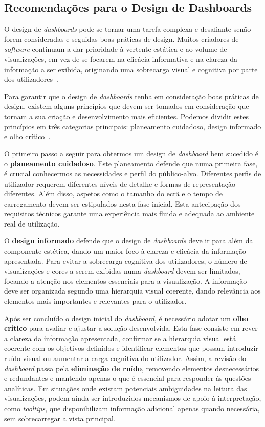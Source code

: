 \subsection{Recomendações para o Design de Dashboards} %
\label{sub:recomendacoes_design}

O design de \textit{dashboards} pode se tornar uma tarefa complexa e desafiante senão forem consideradas e seguidas boas práticas de design. Muitos criadores de \textit{software} continuam a dar prioridade à vertente estática e ao volume de visualizações, em vez de se focarem na eficácia informativa e na clareza da informação a ser exibida, originando uma sobrecarga visual e cognitiva por parte dos utilizadores~\cite{abduldaem2019principles}.

Para garantir que o design de \textit{dashboards} tenha em consideração boas práticas de design, existem alguns princípios que devem ser tomados em consideração que tornam a sua criação e desenvolvimento mais eficientes. Podemos dividir estes princípios em três categorias principais: planeamento cuidadoso, design informado e olho crítico~\cite{Tableau2020}.

O primeiro passo a seguir para obtermos um design de \textit{dashboard} bem sucedido é o \textbf{planeamento cuidadoso}. Este planeamento defende que numa primeira fase, é crucial conhecermos as necessidades e perfil do público-alvo. Diferentes perfis de utilizador requerem diferentes níveis de detalhe e formas de representação diferentes. Além disso, aspetos como o tamanho do ecrã e o tempo de carregamento devem ser estipulados nesta fase inicial. Esta antecipação dos requisitos técnicos garante uma experiência mais fluida e adequada ao ambiente real de utilização.

O \textbf{design informado} defende que o design de \textit{dashboards} deve ir para além da componente estética, dando um maior foco à clareza e eficácia da informação apresentada. Para evitar a sobrecarga cognitiva dos utilizadores, o número de visualizações e cores a serem exibidas numa \textit{dashboard} devem ser limitados, focando a atenção nos elementos essenciais para a visualização. A informação deve ser organizada segundo uma hierarquia visual coerente, dando relevância aos elementos mais importantes e relevantes para o utilizador.  

Após ser concluído o design inicial do \textit{dashboard}, é necessário adotar um \textbf{olho crítico} para avaliar e ajustar a solução desenvolvida. Esta fase consiste em rever a clareza da informação apresentada, confirmar se a hierarquia visual está coerente com os objetivos definidos e identificar elementos que possam introduzir ruído visual ou aumentar a carga cognitiva do utilizador. Assim, a revisão do \textit{dashboard} passa pela \textbf{eliminação de ruído}, removendo elementos desnecessários e redundantes e mantendo apenas o que é essencial para responder às questões analíticas. Em situações onde existam potenciais ambiguidades na leitura das visualizações, podem ainda ser introduzidos mecanismos de apoio à interpretação, como \textit{tooltips}, que disponibilizam informação adicional apenas quando necessária, sem sobrecarregar a vista principal.

